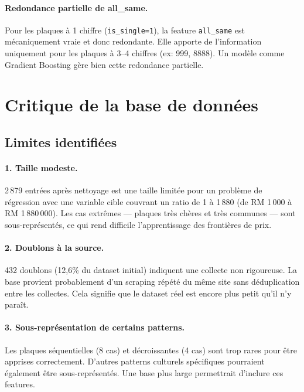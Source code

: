 \documentclass[12pt, a4paper]{article}
\begin{document}
\paragraph{Redondance partielle de all\_same.}
Pour les plaques à 1 chiffre (\texttt{is\_single=1}), la feature \texttt{all\_same} est mécaniquement vraie et donc redondante. Elle apporte de l'information uniquement pour les plaques à 3--4 chiffres (ex: 999, 8888). Un modèle comme Gradient Boosting gère bien cette redondance partielle.

\section{Critique de la base de données}
\label{sec:critique}

\subsection{Limites identifiées}

\paragraph{1. Taille modeste.}
2\,879 entrées après nettoyage est une taille limitée pour un problème de régression avec une variable cible couvrant un ratio de 1 à 1\,880 (de RM 1\,000 à RM 1\,880\,000). Les cas extrêmes — plaques très chères et très communes — sont sous-représentés, ce qui rend difficile l'apprentissage des frontières de prix.

\paragraph{2. Doublons à la source.}
432 doublons (12,6\% du dataset initial) indiquent une collecte non rigoureuse. La base provient probablement d'un scraping répété du même site sans déduplication entre les collectes. Cela signifie que le dataset réel est encore plus petit qu'il n'y paraît.

\paragraph{3. Sous-représentation de certains patterns.}
Les plaques séquentielles (8 cas) et décroissantes (4 cas) sont trop rares pour être apprises correctement. D'autres patterns culturels spécifiques pourraient également être sous-représentés. Une base plus large permettrait d'inclure ces features.
\end{document}
